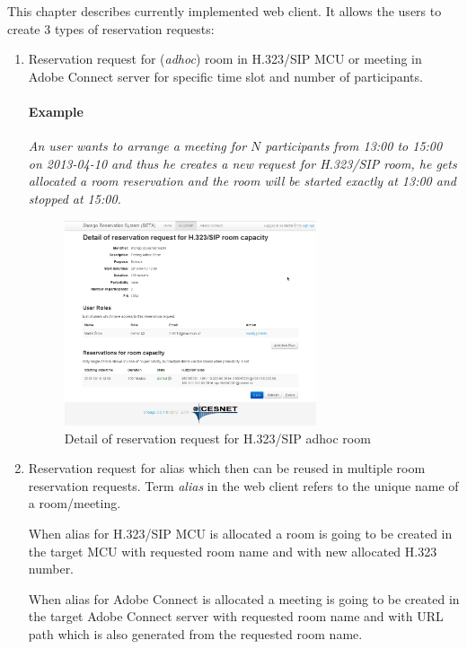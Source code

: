 This chapter describes currently implemented web client. It allows the users to create 3 types of reservation requests:

\begin{enumerate}
\item Reservation request for (\textit{adhoc}) room in H.323/SIP MCU or meeting in Adobe Connect server for specific time slot and number of participants. 
\paragraph{Example}
\textit{An user wants to arrange a meeting for $N$ participants from 13:00 to 15:00 on 2013-04-10 and thus he creates a new request for H.323/SIP room, he gets allocated a room reservation and the room will be started exactly at 13:00 and stopped at 15:00.}

\begin{figure}[ht!]
\centering\includegraphics[width=0.7\textwidth]{images/client_web_detail_room.png}
\caption{Detail of reservation request for H.323/SIP adhoc room}
\label{fig:client-web-detail-alias}
\end{figure}

\item Reservation request for alias which then can be reused in multiple room reservation requests. Term \textit{alias} in the web client refers to the unique name of a room/meeting.

When alias for H.323/SIP MCU is allocated a room is going to be created in the target MCU with requested room name and with new allocated H.323 number.

When alias for Adobe Connect is allocated a meeting is going to be created in the target Adobe Connect server with requested room name and with URL path which is also generated from the requested room name.


\end{enumerate}
